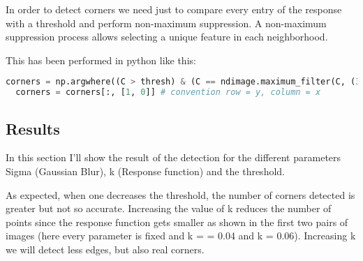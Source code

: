 \documentclass{ETHExercise}
\begin{document}
In order to detect corners we need just to compare every entry of
the response with a threshold and perform non-maximum suppression.
A non-maximum suppression process allows selecting a unique feature in each neighborhood.

This has been performed in python like this:

\begin{lstlisting}[language=Python, caption=corners]
  corners = np.argwhere((C > thresh) & (C == ndimage.maximum_filter(C, (3,3))))
  corners = corners[:, [1, 0]] # convention row = y, column = x
\end{lstlisting}


\subsection{Results}
In this section I'll show the result of the detection for the different parameters Sigma (Gaussian Blur),
k (Response function) and the threshold.

As expected, when one decreases the threshold, the number of corners detected is greater but not so accurate.
Increasing the value of k reduces the number of points since the response function gets smaller as shown in the first two pairs of 
images (here every parameter is fixed and k = = 0.04 and k = 0.06). Increasing k we will
detect less edges, but also real corners. 
\end{document}
